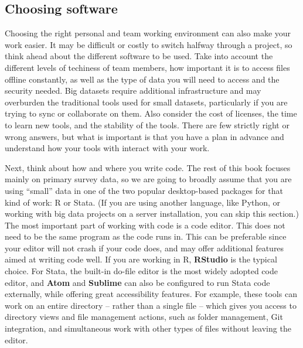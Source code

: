 \subsection{Choosing software}

Choosing the right personal and team working environment can also make your work easier.
It may be difficult or costly to switch halfway through a project, so
think ahead about the different software to be used.
Take into account the different levels of techiness of team members,
how important it is to access files offline constantly,
as well as the type of data you will need to access and the security needed.
Big datasets require additional infrastructure and may overburden
the traditional tools used for small datasets,
particularly if you are trying to sync or collaborate on them.
Also consider the cost of licenses, the time to learn new tools,
and the stability of the tools.
There are few strictly right or wrong answers,
but what is important is that you have a plan in advance
and understand how your tools with interact with your work.

Next, think about how and where you write code.
The rest of this book focuses mainly on primary survey data,
so we are going to broadly assume that you are using ``small'' data
in one of the two popular desktop-based packages for that kind of work: R or Stata.
(If you are using another language, like Python,
or working with big data projects on a server installation,
you can skip this section.)
The most important part of working with code is a code editor.
This does not need to be the same program as the code runs in.
This can be preferable since your editor will not crash if your code does,
and may offer additional features aimed at writing code well.
If you are working in R, \textbf{RStudio} is the typical choice.
For Stata, the built-in do-file editor is the most widely adopted code editor,
and \textbf{Atom} and \textbf{Sublime} can also be configured to run Stata code externally, while offering great accessibility features.
For example, these tools can work on an entire directory -- rather than a single file --
which gives you access to directory views and file management actions,
such as folder management, Git integration, and simultaneous work with other types of files without leaving the editor.

